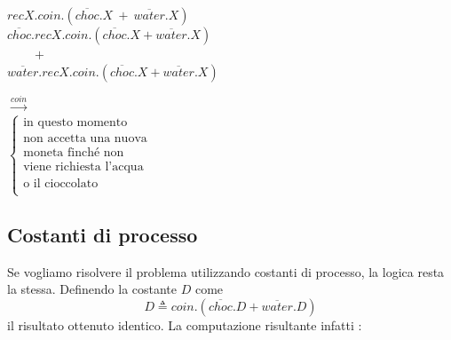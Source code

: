 		\begin{minipage}{0.55\linewidth}
			\begin{flushleft}
				\vspace{-4 mm}
				$recX.coin.(\overline{choc}.X\ + \ \overline{water}.X)$\\
				\vspace{20 mm}
				$\overline{choc}.recX.coin.(\overline{choc}.X + \overline{water}.X)$\\
				$\qquad +$\\
				$\overline{water}.recX.coin.(\overline{choc}.X + \overline{water}.X)$\\
			\end{flushleft}
		\end{minipage}
		\begin{minipage}{0.4\linewidth}
			\begin{flushright}
				\vspace{7 mm}
				$\xrightarrow{coin}$\\
				\vspace{9 mm}
				$\begin{cases}
					\text{in questo momento }\\
					\text{non accetta una nuova}\\
					\text{moneta finch\'e non}\\
					\text{viene richiesta l'acqua}\\
					\text{o il cioccolato}\\
				\end{cases}$\\
			\end{flushright}
		\end{minipage}
		
		\subsection{Costanti di processo}
		
		Se vogliamo risolvere il problema utilizzando costanti di processo, la logica resta la stessa. Definendo la costante $D$ come
		$$D \triangleq coin.(\overline{choc}.D + \overline{water}.D)$$ il risultato ottenuto \eacc identico. La computazione risultante infatti \eacc:
		
